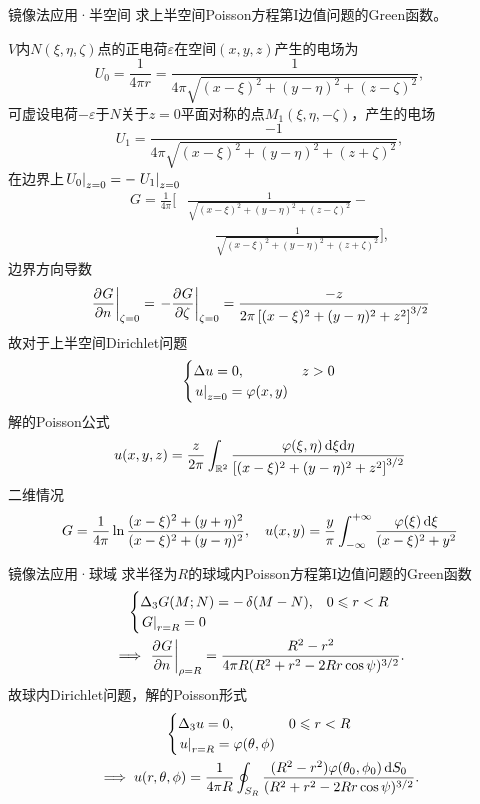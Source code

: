 \begin{example}{镜像法应用·半空间}{}
	求上半空间Poisson方程第I边值问题的Green函数。
	
	$V$内$N(\xi,\eta,\zeta)$点的正电荷$\varepsilon$在空间$(x,y,z)$产生的电场为
	\[
		U_0=\frac1{4\pi r}=\frac1{4\pi\sqrt{(x-\xi)^2+(y-\eta)^2+(z-\zeta)^2}},
	\]
	可虚设电荷$-\varepsilon$于$N$关于$z=0$平面对称的点$M_1(\xi,\eta,-\zeta)$，产生的电场
	\[
		U_1=\frac{-1}{4\pi\sqrt{(x-\xi)^2+(y-\eta)^2+(z+\zeta)^2}},
	\]
	在边界上$\left.U_0\right\rvert_{z=0}=-\left.U_1\right\rvert_{z=0}$
    \begin{align*}
        G=\frac1{4\pi}\bigg[&\frac1{\sqrt{(x-\xi)^2+(y-\eta)^2+(z-\zeta)^2}}-\\
        &\qquad\frac1{\sqrt{(x-\xi)^2+(y-\eta)^2+(z+\zeta)^2}}\bigg],
    \end{align*}
	边界方向导数
	\[
		\left.\frac{\partial^{{}}G}{\partial{n}^{{}}}\right\rvert_{\zeta=0}=\left.-\frac{\partial^{{}}G}{\partial{\zeta}^{{}}}\right\rvert_{\zeta=0}=\frac{-z}{2\pi\left[(x-\xi)^2+(y-\eta)^2+z^2\right]^{3/2}}
	\]
	故对于上半空间Dirichlet问题
	\[
		\begin{cases}
		\Delta u=0,&z>0\\
		\left.u\right\rvert_{z=0}=\varphi(x,y)
	\end{cases}
	\]
	解的Poisson公式
	\[
		u(x,y,z)=\frac z{2\pi}\int_{\mathbb R^2}\frac{\varphi(\xi,\eta)\mathop{}\!\mathrm{d}\xi\mathrm{d}\eta}{\left[(x-\xi)^2+(y-\eta)^2+z^2\right]^{3/2}}
	\]
	\tcblower
	二维情况
	\[
		G=\frac1{4\pi}\ln\frac{(x-\xi)^2+(y+\eta)^2}{(x-\xi)^2+(y-\eta)^2},\quad u(x,y)=\frac y\pi\int_{-\infty}^{+\infty}\frac{\varphi(\xi)\mathop{}\!\mathrm{d}\xi}{(x-\xi)^2+y^2}
	\]
\end{example}

\begin{example}{镜像法应用·球域}{}
	求半径为$R$的球域内Poisson方程第I边值问题的Green函数
	\begin{gather*}
		\begin{cases}
			\Delta_3G(M;N)=-\mathop{}\!\delta(M-N),&0\leqslant r<R\\
			\left.G\right\rvert_{r=R}=0
		\end{cases}\\
		\implies \left.\frac{\partial^{{}}G}{\partial{n}^{{}}}\right\rvert_{\rho=R}=\frac{R^2-r^2}{4\pi R(R^2+r^2-2Rr\cos\psi)^{3/2}}.
	\end{gather*}
	故球内Dirichlet问题，解的Poisson形式
	\begin{gather*}
		\begin{cases}
			\Delta_3u=0,&0\leqslant r<R\\
			\left.u\right\rvert_{r=R}=\varphi(\theta,\phi)
		\end{cases}\\
		\implies u(r,\theta,\phi)=\frac1{4\pi R}\oint_{S_R}\frac{(R^2-r^2)\varphi(\theta_0,\phi_0)\mathop{}\!\mathrm{d} S_0}{(R^2+r^2-2Rr\cos\psi)^{3/2}}.
	\end{gather*}
\end{example}

